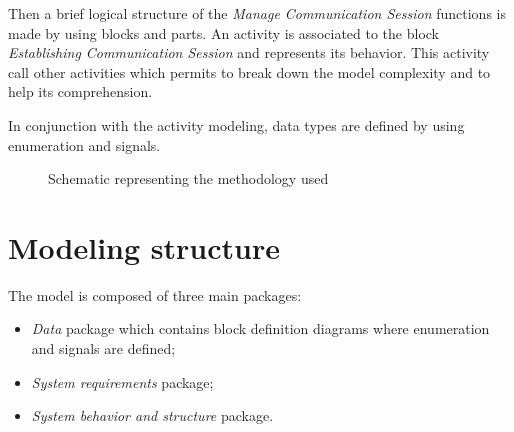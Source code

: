 \documentclass{template/openetcs_report}
\newcommand\packageName[1]{\emph{#1}}
\begin{document}
Then a brief logical structure of the \textsl{Manage Communication Session} functions is made by using blocks and parts.
An activity is associated to the block \textsl{Establishing Communication Session} and represents its behavior. This activity call other activities which permits to break down the model complexity and to help its comprehension.

In conjunction with the activity modeling, data types are defined by using enumeration and signals.

\begin{figure}[h]
  \centering
  \caption{Schematic representing the methodology used}
  \label{fig:Modeling_strategy}
\end{figure}

\section{Modeling structure}

The model is composed of three main packages:
\begin{itemize}
	\item \packageName{Data} package which contains block definition diagrams where enumeration and signals are defined;
	\item \packageName{System requirements} package;
	\item \packageName{System behavior and structure} package.
\end{itemize}
\end{document}
